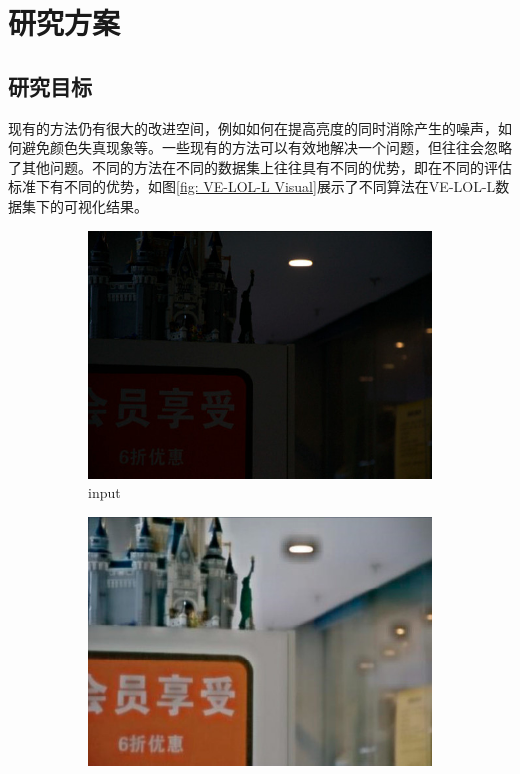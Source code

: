 \documentclass[a4paper]{ctexart}
\begin{document}
	\section{研究方案}
	
	\subsection{研究目标}
	
	现有的方法仍有很大的改进空间，例如如何在提高亮度的同时消除产生的噪声，如何避免颜色失真现象等。一些现有的方法可以有效地解决一个问题，但往往会忽略了其他问题。不同的方法在不同的数据集上往往具有不同的优势，即在不同的评估标准下有不同的优势，如图\ref{fig: VE-LOL-L Visual}展示了不同算法在VE-LOL-L数据集\cite{liu2021benchmarking}下的可视化结果。
	
	\begin{figure}[htbp]
		\centering
		\begin{subfigure}{0.17\columnwidth}
			\includegraphics[width=\linewidth]{picture/LLIE/VE-LOL-L/input}
			\captionsetup{font=scriptsize}
			\caption*{input \\ \quad }
			\label{fig: input}
		\end{subfigure}
		\begin{subfigure}{0.17\columnwidth}
			\includegraphics[width=\linewidth]{picture/LLIE/VE-LOL-L/LLNet}

\end{subfigure}
\end{figure}
\end{document}
